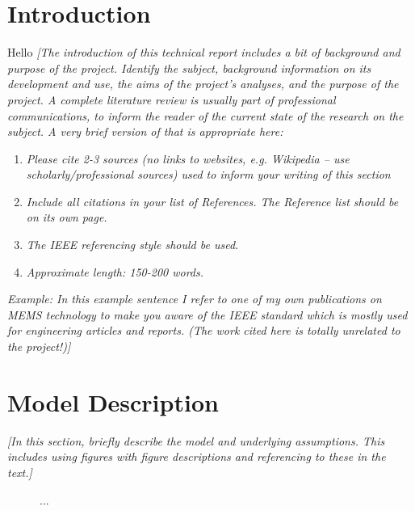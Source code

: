 \documentclass[11pt]{article}
\begin{document}
\section*{Introduction}
Hello
\textcolor[rgb]{0.80,0.29,0.09}{\textsl{[The introduction of this technical report includes a bit of background and purpose of the project. Identify the subject, background information on its development and use, the aims of the project’s analyses, and the purpose of the project. A complete literature review is usually part of professional communications, to inform the reader of the current state of the research on the subject. A very brief version of that is appropriate here:}}
\begin{enumerate}
  \item \textcolor[rgb]{0.80,0.29,0.09}{\textsl{Please cite 2-3 sources (no links to websites, e.g. Wikipedia – use scholarly/professional sources) used to inform your writing of this section}}
  \item \textcolor[rgb]{0.80,0.29,0.09}{\textsl{Include all citations in your list of References. The Reference list should be on its own page.}}
  \item \textcolor[rgb]{0.80,0.29,0.09}{\textsl{The IEEE referencing style should be used.}}
  \item \textcolor[rgb]{0.80,0.29,0.09}{\textsl{Approximate length: 150-200 words.}}
\end{enumerate}
\textcolor[rgb]{0.80,0.29,0.09}{\textsl{Example: In this example sentence I refer to one of my own publications on MEMS technology \cite{gutschmidt2024} to make you aware of the IEEE standard \cite{IEEE} which is mostly used for engineering articles and reports. (The work cited here is totally unrelated to the project!)]}}


\section*{Model Description}
\textcolor[rgb]{0.80,0.29,0.09}{\textsl{[In this section, briefly describe the model and underlying assumptions. This includes using figures with figure descriptions and referencing to these in the text.]}}

\begin{figure}[h!]
  \centering
  \caption{...}\label{fig:model}
\end{figure}

\end{document}
